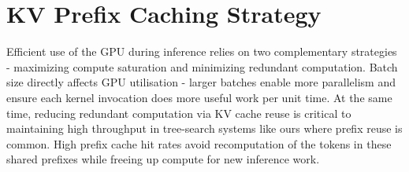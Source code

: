 \documentclass[12pt,twoside]{report}
\begin{document}
\chapter{KV Prefix Caching Strategy}

Efficient use of the GPU during inference relies on two complementary strategies - maximizing compute saturation and minimizing redundant computation. 
Batch size directly affects GPU utilisation - larger batches enable more parallelism and ensure each kernel invocation does more useful work per unit time. 
At the same time, reducing redundant computation via KV cache reuse is critical to maintaining high throughput in tree-search systems like ours where prefix reuse is common.
High prefix cache hit rates avoid recomputation of the tokens in these shared prefixes while freeing up compute for new inference work.
\end{document}
